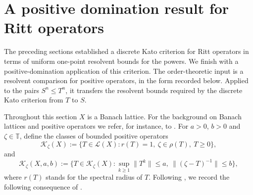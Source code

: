 \documentclass[11pt]{amsart}
\numberwithin{equation}{section}
\theoremstyle{definition}
\theoremstyle{plain}
\def\T{\mathbb{T}}
\def\L{L}
\renewcommand{\L}{\mathcal L}
\begin{document}
\section{A positive domination result for Ritt operators}\label{sec:positive-domination-ritt}

The preceding sections established a discrete Kato criterion for Ritt operators in terms of uniform one-point resolvent bounds for the powers. We finish with a positive-domination application of this criterion. The order-theoretic input is a resolvent comparison for positive operators, in the form recorded below. Applied to the pairs $S^n\le T^n$, it transfers the resolvent bounds required by the discrete Kato criterion from $T$ to $S$.

Throughout this section \(X\) is a Banach lattice.  For the background on
Banach lattices and positive operators we refer, for instance, to
\cite{Meyer}.
For $a>0$, $b>0$ and $\zeta\in\T$, define the classes of bounded positive operators
\[
\mathcal K_\zeta(X):=\{T\in\L(X): r(T)=1,\ \zeta\in\rho(T),\ T\ge0\},
\]
and
\[
\mathcal K_\zeta(X,a,b):=
\{T\in\mathcal K_\zeta(X):\sup_{k\ge1}\|T^k\|\le a,
\ \|(\zeta -T)^{-1}\|\le b\},
\]
where $r(T)$ stands for the spectral radius of $T.$
Following \cite[Lemma~4]{Gluck}, we record the following consequence of \cite[Theorem~1.4]{Rabiger}.
\end{document}
